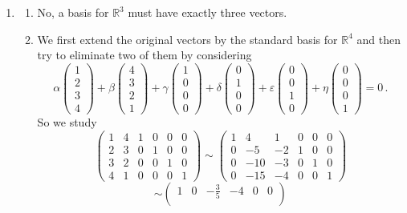 \begin{enumerate}
\item \begin{enumerate}
\item No, a basis for  ${\mathbb R}^3$ must have exactly three vectors.
\item We first extend the original vectors by the standard basis for ${\mathbb R}^4$ and then try to eliminate two of them by considering
$$
\alpha \begin{pmatrix}1\\2\\3\\4\end{pmatrix}+\beta
\begin{pmatrix}4\\3\\2\\1\end{pmatrix} +\gamma 
\begin{pmatrix}1\\0\\0\\0\end{pmatrix}
+\delta\begin{pmatrix}0\\1\\0\\0\end{pmatrix}
+\varepsilon\begin{pmatrix}0\\0\\1\\0\end{pmatrix}
+\eta\begin{pmatrix}0\\0\\0\\1\end{pmatrix}=0\, .
$$ 
So we study
$$
\begin{pmatrix}
1&4&1&0&0&0\\
2&3&0&1&0&0\\
3&2&0&0&1&0\\
4&1&0&0&0&1
\end{pmatrix}
\sim
\begin{pmatrix}
1&4&1&0&0&0\\
0&-5&-2&1&0&0\\
0&-10&-3&0&1&0\\
0&-15&-4&0&0&1
\end{pmatrix}
$$
$$
\sim
\begin{pmatrix}
1&0&-\frac35&-4&0&0\\

\end{pmatrix}$$
\end{enumerate}
\end{enumerate}
